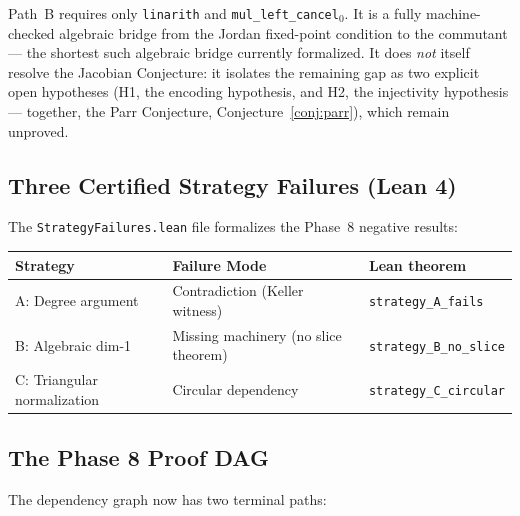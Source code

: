 \documentclass[12pt, letterpaper]{article}
\theoremstyle{plain}
\theoremstyle{definition}
\theoremstyle{remark}
\begin{document}
\begin{noveltybox}[title={Path B is new. Path A is 127 years old.}]
Path~B requires only \texttt{linarith} and \texttt{mul\_left\_cancel$_0$}.
It is a fully machine-checked algebraic bridge from the Jordan fixed-point
condition to the commutant --- the shortest such algebraic bridge currently
formalized.
It does \emph{not} itself resolve the Jacobian Conjecture: it isolates the
remaining gap as two explicit open hypotheses (H1, the encoding hypothesis,
and H2, the injectivity hypothesis --- together, the Parr Conjecture,
Conjecture~\ref{conj:parr}), which remain unproved.
\end{noveltybox}

\subsection{Three Certified Strategy Failures (Lean 4)}

The \texttt{StrategyFailures.lean} file formalizes the Phase~8 negative results:

\begin{center}
\begin{tabular}{@{}lll@{}}
\toprule
\textbf{Strategy} & \textbf{Failure Mode} & \textbf{Lean theorem} \\
\midrule
A: Degree argument & Contradiction (Keller witness) & \texttt{strategy\_A\_fails} \\
B: Algebraic dim-1 & Missing machinery (no slice theorem) & \texttt{strategy\_B\_no\_slice} \\
C: Triangular normalization & Circular dependency & \texttt{strategy\_C\_circular} \\
\bottomrule
\end{tabular}
\end{center}

\subsection{The Phase 8 Proof DAG}

The dependency graph now has two terminal paths:
\end{document}
